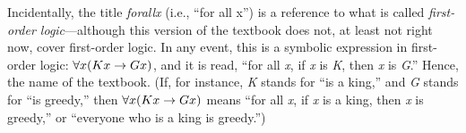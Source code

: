 Incidentally, the title \textit{forall\hspace{.10em}x} (i.e., ``for all x'') is a reference to what is called \textit{first-order logic}---although this version of the textbook does not, at least not right now, cover first-order logic. In any event, this is a symbolic expression in first-order logic: $\forall x(Kx \rightarrow Gx)$, and it is read, “for all \textit{x}, if \textit{x} is \textit{K}, then \textit{x} is \textit{G}.” Hence, the name of the textbook. (If, for instance, \textit{K} stands for ``is a king,'' and \textit{G} stands for ``is greedy,'' then $\forall x(Kx \rightarrow Gx)$ means ``for all \textit{x}, if \textit{x} is a king, then \textit{x} is greedy,'' or ``everyone who is a king is greedy.'')